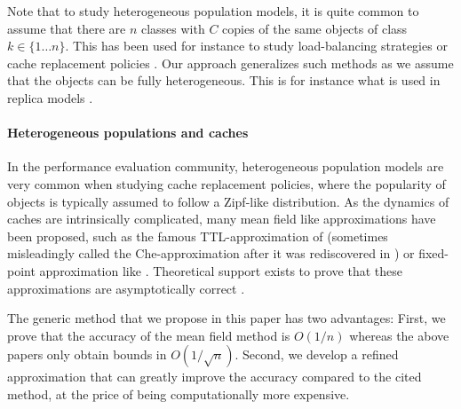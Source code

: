 \documentclass[acmsmall]{acmart}
\begin{document}
Note that to study heterogeneous population models, it is quite common to assume that there are $n$ classes with $C$ copies of the same objects of class $k\in\{1\dots n\}$. This has been used for instance to study load-balancing strategies \cite{mukhopadhyayAnalysisLoadBalancing2015} or cache replacement policies \cite{hirade1,tsukada1}. Our approach generalizes such methods as we assume that the objects can be fully heterogeneous. This is for instance what is used in replica models \cite{mezard1987sk,baccelli2019replica}. 

\paragraph*{Heterogeneous populations and caches} In the performance evaluation community, heterogeneous population models are very common when studying cache replacement policies, where the popularity of objects is typically assumed to follow a Zipf-like distribution. As the dynamics of caches are intrinsically complicated, many mean field like approximations have been proposed, such as the famous TTL-approximation of \cite{fagin1977asymptotic} (sometimes misleadingly called the Che-approximation after it was rediscovered in \cite{che2001analysis}) or fixed-point approximation like \cite{dan1990approximate}. Theoretical support exists to prove that these approximations are asymptotically correct \cite{fricker2012versatile,jiang2018convergence,gastTransientSteadystateRegime2015}. 

The generic method that we propose in this paper has two advantages: First, we prove that the accuracy of the mean field method is $O(1/n)$ whereas the above papers only obtain bounds in $O(1/\sqrt{n})$. Second, we develop a refined approximation that can greatly improve the accuracy compared to the cited method, at the price of being computationally more expensive.
\end{document}
